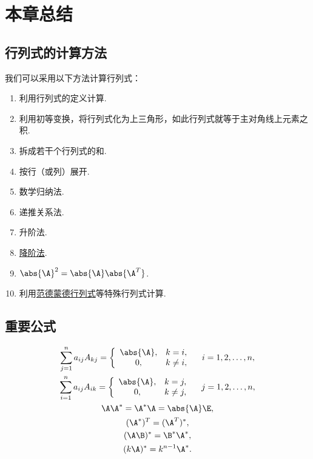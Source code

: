 \section{本章总结}
\subsection*{行列式的计算方法}
我们可以采用以下方法计算行列式：
\begin{enumerate}
	\item 利用行列式的定义计算.
	\item 利用初等变换，将行列式化为上三角形，如此行列式就等于主对角线上元素之积.
	\item 拆成若干个行列式的和.
	\item 按行（或列）展开.
	\item 数学归纳法.
	\item 递推关系法.
	\item 升阶法.
	\item \hyperref[theorem:逆矩阵.行列式降阶定理]{降阶法}.
	\item \(\abs{\A}^2 = \abs{\A} \abs{\A^T}\).
	\item 利用\hyperref[equation:行列式.范德蒙德行列式]{范德蒙德行列式}等特殊行列式计算.
\end{enumerate}

\subsection*{重要公式}
\begin{gather*}
	\sum_{j=1}^n a_{ij} A_{kj}
	= \left\{ \begin{array}{cl}
		\abs{\A}, & k = i, \\
		0, & k \neq i,
	\end{array} \right.
	\quad i=1,2,\dotsc,n, \\
	\sum_{i=1}^n a_{ij} A_{ik}
	= \left\{ \begin{array}{cl}
		\abs{\A}, & k = j, \\
		0, & k \neq j,
	\end{array} \right.
	\quad j=1,2,\dotsc,n, \\
	\A \A^* = \A^* \A = \abs{\A} \E, \\ %
	(\A^*)^T = (\A^T)^*, \\ %
	(\A \B)^* = \B^* \A^*, \\ %
	(k \A)^* = k^{n-1} \A^*. %
\end{gather*}

